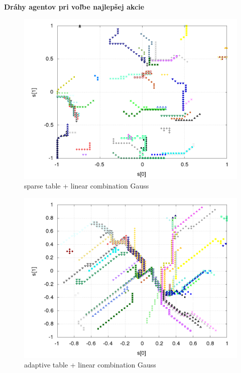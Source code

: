 \documentclass[xcolor=dvipsnames]{beamer}
\begin{document}
\begin{frame}{\bf Dráhy agentov pri voľbe najlepšej akcie}

\begin{minipage}{.5\textwidth}

  \begin{figure}[!htb]
  \centering
  \includegraphics[scale=.2]{../../results_q_learning/map_2/function_type_3/iterations_10/agents_path_surface.png}
  \caption{sparse table + linear combination Gauss}
  \end{figure}


\end{minipage}%
\begin{minipage}{.5\textwidth}

  \begin{figure}[!htb]
  \centering
  \includegraphics[scale=.2]{../../results_q_learning/map_2/function_type_6/iterations_10/agents_path_surface.png}
  \caption{adaptive table + linear combination Gauss}
  \end{figure}

\end{minipage}

\end{frame}
\end{document}
